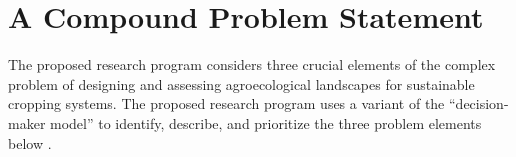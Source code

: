 \begin{comment}
Industrial agriculture likewise threatens environmental sustainability. Humans rely on a functional biosphere for life support and industrial agriculture's externalized costs are environmentally devastating at the global scale \citep{tilman_agricultural_2002, wolfe_crop_2000, ceballos_accelerated_2015}. To take but two of many quantitative examples, the anthropogenic sources of reactive nitrogen that are directly linked to agriculture (i.e., fertilizer production by N-fixation from the Haber-Bosch process and fertilizer production by N-fixation from cultivation) now contribute reactive nitrogen to the biosphere at nearly double the rate of terrestrial nitrogen fixation (i.e., at about $13 \ x \ 10^{12} \ mol \ yr^{-1}$) \citep{canfield_evolution_2010}. And the agricultural sector is the third largest contributor of greenhouse gases behind transportation and power generation \citep{gliessman_agroecology:_2015}.

Finally, industrial agriculture can disrupt social sustainability. Confronted with industrial agricultural practices, rural agricultural communities may experience a loss of local control over agricultural production with a resulting loss in place-based knowledge, human capital, and civic engagement \citep{beus_conventional_1990, oecd_well-being_2001}. Recently concerns have been raised over the social costs of inequities in the final distribution of benefits and burdens associated with the production of ecosystem goods and services \citep{berbes-blazquez_towards_2016}.
\end{comment}

\section{A Compound Problem Statement}
The proposed research program considers three crucial elements of the complex problem of designing and assessing agroecological landscapes for sustainable cropping systems. The proposed research program uses a variant of the \enquote{decision-maker model} to identify, describe, and prioritize the three problem elements below \citep{gordon_planning_2007}. 

